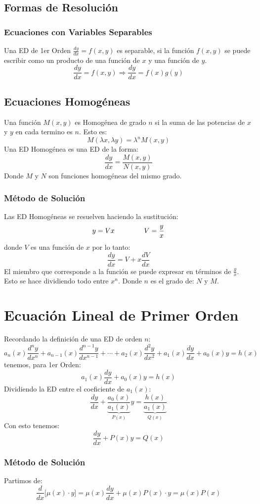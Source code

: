 \section{Formas de Resolución}
\subsection{Ecuaciones con Variables Separables}
Una ED de 1er Orden $\frac{dy}{dx}=f(x,y)$ es separable, si la función $f(x,y)$ se puede escribir como un producto de una función de $x$ y una función de $y$.
$$\dfrac{dy}{dx}=f(x,y)\Rightarrow \dfrac{dy}{dx}=f(x)g(y)$$
\section{Ecuaciones Homogéneas}
Una función $M(x,y)$ es Homogénea de grado $n$ si la suma de las potencias de $x$ y $y$ en cada termino es $n$. Esto es:
$$M(\lambda x,\lambda y)=\lambda^nM(x,y)$$
Una ED Homogénea es una ED de la forma:
$$\dfrac{dy}{dx}=\dfrac{M(x,y)}{N(x,y)}$$
Donde $M$ y $N$ son funciones homogéneas del mismo grado.
\subsection{Método de Solución}
Las ED Homogéneas se resuelven haciendo la sustitución:
$$y=Vx \hspace{1.5cm} V=\dfrac{y}{x}$$
donde $V$ es una función de $x$ por lo tanto:
$$\dfrac{dy}{dx}=V+x\dfrac{dV}{dx}$$
El miembro que corresponde a la función se puede expresar en términos de $\frac{y}{x}$. Esto se hace dividiendo todo entre $x^n$. Donde $n$ es el grado de: $N$ y $M$.
\chapter{Ecuación Lineal de Primer Orden}
Recordando la definición de una ED de orden $n$:
$$a_n(x)\dfrac{d^ny}{dx^n}+a_{n-1}(x)\dfrac{d^{n-1}y}{dx^{n-1}}+\cdots + a_2(x)\dfrac{d^2y}{dx^2}+a_1(x)\dfrac{dy}{dx}+a_0(x)y=h(x)$$
tenemos, para 1er Orden:
\begin{equation}
a_1(x)\dfrac{dy}{dx}+a_0(x)y=h(x)
\end{equation}
Dividiendo la ED entre el coeficiente de $a_1(x)$:
$$\dfrac{dy}{dx}+\underbrace{\dfrac{a_0(x)}{a_1(x)}}_{P(x)}y=\underbrace{\dfrac{h(x)}{a_1(x)}}_{Q(x)}$$
Con esto tenemos:
\begin{equation}
\dfrac{dy}{dx}+P(x)y=Q(x)
\end{equation}
\subsection*{Método de Solución}
Partimos de:
$$\dfrac{d}{dx}\Bigg[\mu(x)\cdot y\Bigg]=\mu(x)\dfrac{dy}{dx}+\mu(x)P(x) \cdot y = \mu(x)P(x) $$

